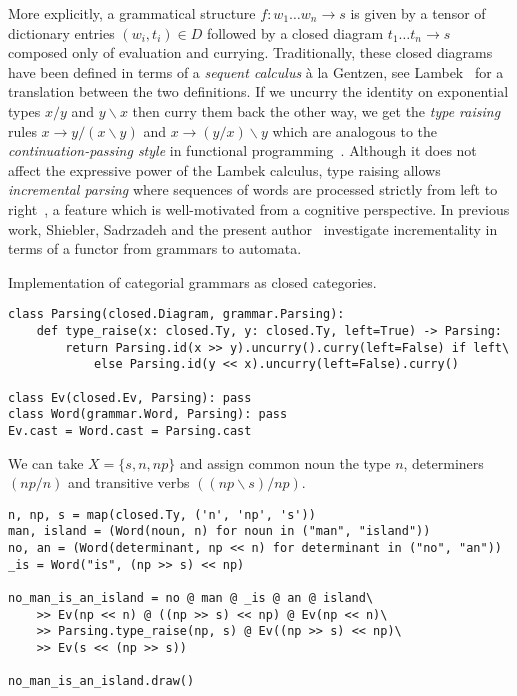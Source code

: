 More explicitly, a grammatical structure $f : w_1 \dots w_n \to s$ is given by a tensor of dictionary entries $(w_i, t_i) \in D$ followed by a closed diagram $t_1 \dots t_n \to s$ composed only of evaluation and currying.
Traditionally, these closed diagrams have been defined in terms of a \emph{sequent calculus} à la Gentzen, see Lambek~\cite{Lambek88} for a translation between the two definitions.
If we uncurry the identity on exponential types $x / y$ and $y \backslash x$ then curry them back the other way, we get the \emph{type raising} rules $x \to y / (x \backslash y)$ and $x \to (y / x) \backslash y$ which are analogous to the \emph{continuation-passing style} in functional programming~\cite{DeGroote01}.
Although it does not affect the expressive power of the Lambek calculus, type raising allows \emph{incremental parsing} where sequences of words are processed strictly from left to right~\cite{Dowty88,Steedman91}, a feature which is well-motivated from a cognitive perspective.
In previous work, Shiebler, Sadrzadeh and the present author~\cite{ShieblerEtAl20} investigate incrementality in terms of a functor from grammars to automata.

\begin{python}
{\normalfont Implementation of categorial grammars as closed categories.}

\begin{verbatim}
class Parsing(closed.Diagram, grammar.Parsing):
    def type_raise(x: closed.Ty, y: closed.Ty, left=True) -> Parsing:
        return Parsing.id(x >> y).uncurry().curry(left=False) if left\
            else Parsing.id(y << x).uncurry(left=False).curry()

class Ev(closed.Ev, Parsing): pass
class Word(grammar.Word, Parsing): pass
Ev.cast = Word.cast = Parsing.cast
\end{verbatim}
\end{python}

\begin{example}
We can take $X = \{ s, n, np \}$ and assign common noun the type $n$, determiners $(np / n)$ and transitive verbs $((np \backslash s) / np)$.

\begin{verbatim}
n, np, s = map(closed.Ty, ('n', 'np', 's'))
man, island = (Word(noun, n) for noun in ("man", "island"))
no, an = (Word(determinant, np << n) for determinant in ("no", "an"))
_is = Word("is", (np >> s) << np)

no_man_is_an_island = no @ man @ _is @ an @ island\
    >> Ev(np << n) @ ((np >> s) << np) @ Ev(np << n)\
    >> Parsing.type_raise(np, s) @ Ev((np >> s) << np)\
    >> Ev(s << (np >> s))

no_man_is_an_island.draw()
\end{verbatim}
\end{example}

